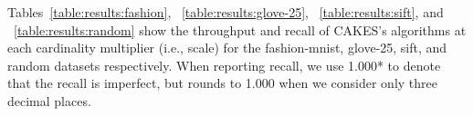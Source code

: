 

Tables~\ref{table:results:fashion}, ~\ref{table:results:glove-25}, ~\ref{table:results:sift}, and ~\ref{table:results:random} show the throughput and recall of CAKES's algorithms at each cardinality multiplier (i.e., scale) for the fashion-mnist, glove-25, sift, and random datasets respectively. When reporting recall, we use 1.000* to denote that the recall is imperfect, but rounds to 1.000 when we consider only three decimal places.



